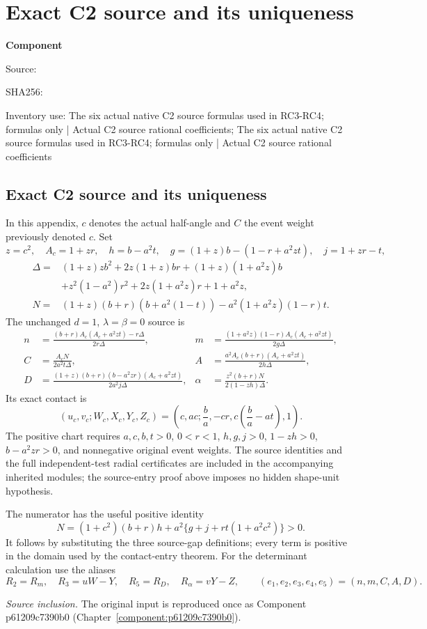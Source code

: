 \chapter{Exact C2 source and its uniqueness}
\label{component:p6e5d41ed80b3}
\noindent\textbf{Component }\par
{\small\noindent Source: \par}
{\small\noindent SHA256: \par}
{\small\noindent Inventory use: The six actual native C2 source formulas used in RC3-RC4; formulas only | Actual C2 source rational coefficients; The six actual native C2 source formulas used in RC3-RC4; formulas only | Actual C2 source rational coefficients\par}
\medskip
\section{Exact C2 source and its uniqueness}\label{p6e5d41ed80b3:app:c2-source}
In this appendix, $c$ denotes the actual half-angle and
$C$ the event weight previously denoted $c$. Set
\[
 z=c^2,\quad A_c=1+zr,\quad
 h=b-a^2t,\quad g=(1+z)b-(1-r+a^2zt),\quad j=1+zr-t,
\]
\begin{align*}
\Delta={}&(1+z)zb^2+2z(1+z)br+(1+z)(1+a^2z)b\\
 &+z^2(1-a^2)r^2+2z(1+a^2z)r+1+a^2z,\\
N={}&(1+z)(b+r)(b+a^2(1-t))-a^2(1+a^2z)(1-r)t.
\end{align*}
The unchanged $d=1$, $\lambda=\beta=0$ source is
\begin{align*}
n&=\frac{(b+r)A_c(A_c+a^2zt)-r\Delta}{2r\Delta},&
m&=\frac{(1+a^2z)(1-r)A_c(A_c+a^2zt)}{2g\Delta},\\
C&=\frac{A_cN}{2a^2t\Delta},&
A&=\frac{a^2A_c(b+r)(A_c+a^2zt)}{2h\Delta},\\
D&=\frac{(1+z)(b+r)(b-a^2zr)(A_c+a^2zt)}{2a^2j\Delta},&
\alpha&=\frac{z^2(b+r)N}{2(1-zh)\Delta}.
\end{align*}
Its exact contact is
\[
 (u_c,v_c;W_c,X_c,Y_c,Z_c)
   =\left(c,ac;\frac ba,-cr,c\left(\frac ba-at\right),1\right).
\]
The positive chart requires $a,c,b,t>0$, $0<r<1$, $h,g,j>0$,
$1-zh>0$, $b-a^2zr>0$, and nonnegative original event weights.
The source identities and the full independent-test radial certificates
are included in the accompanying inherited modules; the source-entry
proof above imposes no hidden shape-unit hypothesis.


The numerator has the useful positive identity
\[
N=(1+c^2)(b+r)h+a^2\{g+j+rt(1+a^2c^2)\}>0.
\]
It follows by substituting the three source-gap definitions; every term
is positive in the domain used by the contact-entry theorem.
For the determinant calculation use the aliases
\[
 R_2=R_m,\quad R_3=uW-Y,\quad R_5=R_D,\quad R_\alpha=vY-Z,
 \qquad(e_1,e_2,e_3,e_4,e_5)=(n,m,C,A,D).
\]
\par\noindent\textit{Source inclusion. }The original input is reproduced once as Component p61209c7390b0 (Chapter~\ref{component:p61209c7390b0}).\par

